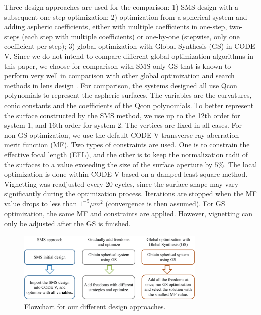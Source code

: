 Three design approaches are used for the comparison: 1) SMS design with a subsequent one-step optimization; 2) optimization from a spherical system and adding aspheric coefficients, either with multiple coefficients in one-step, two-steps (each step with multiple coefficients) or one-by-one (stepwise, only one coefficient per step); 3) global optimization with Global Synthesis (GS) in CODE V. Since we do not intend to compare different global optimization algorithms in this paper, we choose for comparison with SMS only GS that is known to perform very well in comparison with other global optimization and search methods in lens design \cite{KuperGO1992}\cite{ShaferComPhy1994}. For comparison, the systems designed all use Qcon polynomials to represent the aspheric surfaces. The variables are the curvatures, conic constants and the coefficients of the Qcon polynomials. To better represent the surface constructed by the SMS method, we use up to the 12th order for system 1, and 16th order for system 2. The vertices are fixed in all cases. For non-GS optimization, we use the default CODE V transverse ray aberration merit function (MF). Two types of constraints are used. One is to constrain the effective focal length (EFL), and the other is to keep the normalization radii of the surfaces to a value exceeding the size of the surface aperture by $5\%$. The local optimization is done within CODE V based on a damped least square method. Vignetting was readjusted every 20 cycles, since the surface shape may vary significantly during the optimization process. Iterations are stopped when the MF value drops to less than $1^{-5} \mu m^2$ (convergence is then assumed). For GS optimization, the same MF and constraints are applied. However, vignetting can only be adjusted after the GS is finished. 

\begin{figure}[h!]
    \centering
    \includegraphics[width=0.8\textwidth]{chapter-5/figures/Fig3_flowchart.png}
    \caption{Flowchart for our different design approaches.}
    \label{fig: fig3_flowchart}
\end{figure}

